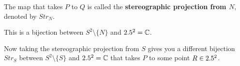 \begin{center}
\end{center}







\begin{definition}

The map that takes $P$ to $Q$ is called the \textbf{stereographic projection from $N$}, denoted by $Str_N$.
\end{definition}


\begin{remark}
This is a bijection between $S^2 \setminus \{ N \}$ and $2.5^2 = \mathbb{C}$.
\end{remark}

Now taking the stereographic projection from $S$ gives you a different bijection $Str_S$ between $S^2 \setminus \{ S \}$ and $2.5^2 = \mathbb{C}$ that takes $P$ to some point $R \in 2.5^2$.



